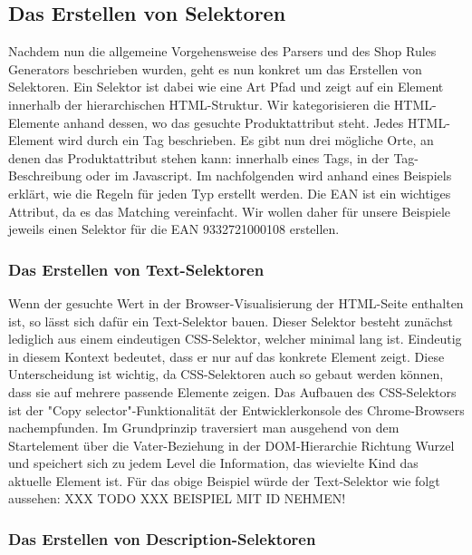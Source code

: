 \subsection{Das Erstellen von Selektoren}
\label{subsec:erstellen-von-selektoren}

Nachdem nun die allgemeine Vorgehensweise des Parsers und des Shop Rules Generators beschrieben wurden, geht es nun
konkret um das Erstellen von Selektoren.
Ein Selektor ist dabei wie eine Art Pfad und zeigt auf ein Element innerhalb der hierarchischen HTML-Struktur.
Wir kategorisieren die HTML-Elemente anhand dessen, wo das gesuchte Produktattribut steht.
Jedes HTML-Element wird durch ein Tag beschrieben.
Es gibt nun drei mögliche Orte, an denen das Produktattribut stehen kann: innerhalb eines Tags, in der Tag-Beschreibung
oder im Javascript.
Im nachfolgenden wird anhand eines Beispiels erklärt, wie die Regeln für jeden Typ erstellt werden.
Die EAN ist ein wichtiges Attribut, da es das Matching vereinfacht.
Wir wollen daher für unsere Beispiele jeweils einen Selektor für die EAN 9332721000108 erstellen.

\subsubsection{Das Erstellen von Text-Selektoren}
\label{subsubsec:erstellen-von-text-selektoren}

Wenn der gesuchte Wert in der Browser-Visualisierung der HTML-Seite enthalten ist, so lässt sich dafür ein
Text-Selektor bauen.
Dieser Selektor besteht zunächst lediglich aus einem eindeutigen CSS-Selektor, welcher minimal lang ist.
Eindeutig in diesem Kontext bedeutet, dass er nur auf das konkrete Element zeigt.
Diese Unterscheidung ist wichtig, da CSS-Selektoren auch so gebaut werden können, dass sie auf mehrere passende
Elemente zeigen.
Das Aufbauen des CSS-Selektors ist der "Copy selector"-Funktionalität der Entwicklerkonsole des Chrome-Browsers
nachempfunden.
Im Grundprinzip traversiert man ausgehend von dem Startelement über die Vater-Beziehung in der
DOM-Hierarchie Richtung Wurzel und speichert sich zu jedem Level die Information, das wievielte Kind das aktuelle
Element ist.
Für das obige Beispiel würde der Text-Selektor wie folgt aussehen: XXX TODO XXX BEISPIEL MIT ID NEHMEN!

\subsubsection{Das Erstellen von Description-Selektoren}
\label{subsubsec:erstellen-von-description-selektoren}

